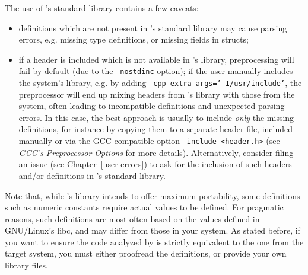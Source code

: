 The use of \FramaC's standard library contains a few caveats:
\begin{itemize}
\item definitions which are not present in \FramaC's standard library may cause
  parsing errors, e.g. missing type definitions, or missing fields in structs;
\item if a header is included which is not available in \FramaC's library,
  preprocessing will fail by default (due to the \texttt{-nostdinc} option);
  if the user manually includes the system's library, e.g. by adding
  \texttt{-cpp-extra-args='-I/usr/include'}, the preprocessor will end up
  mixing headers from \FramaC's library with those from the system, often
  leading to incompatible definitions and unexpected parsing errors.
  In this case, the best approach is usually to include {\em only} the missing
  definitions, for instance by copying them to a separate header file, included
  manually or via the GCC-compatible option \texttt{-include <header.h>}
  (see {\em GCC's Preprocessor Options} for more details). Alternatively,
  consider filing an issue (see Chapter~\ref{user-errors}) to ask for the
  inclusion of such headers and/or definitions in \FramaC's standard library.
\end{itemize}

Note that, while \FramaC's library intends to offer maximum portability, some
definitions such as numeric constants require actual values to be defined.
For pragmatic reasons, such definitions are most often based on the values
defined in GNU/Linux's libc, and may differ from those in your system.
As stated before, if you want to ensure the code analyzed by \FramaC is
strictly equivalent to the one from the target system, you must either
proofread the definitions, or provide your own library files.





